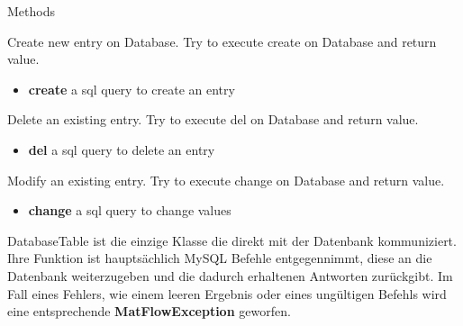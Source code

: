 \begin{methodenv}{Methods}
	
 Create new entry on Database. Try to execute create on Database and return value.

\begin{itemize}
	\item \textbf{create} 
	a sql query to create an entry
\end{itemize}

 Delete an existing entry. Try to execute del on Database and return value.

\begin{itemize}
	\item \textbf{del} 
	a sql query to delete an entry
\end{itemize}

 Modify an existing entry. Try to execute change on Database and return value.

\begin{itemize}
	\item \textbf{change} 
	a sql query to change values
\end{itemize}

\end{methodenv}

DatabaseTable ist die einzige Klasse die direkt mit der Datenbank kommuniziert. Ihre Funktion ist hauptsächlich MySQL Befehle entgegennimmt, diese an die Datenbank weiterzugeben und die dadurch erhaltenen Antworten zurückgibt. Im Fall eines Fehlers, wie einem leeren Ergebnis oder eines ungültigen Befehls wird eine entsprechende \textbf{MatFlowException} geworfen.

